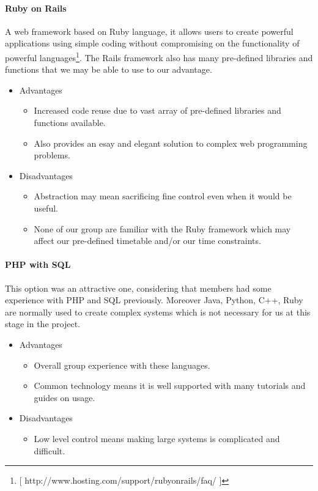\paragraph{Ruby on Rails}
A web framework based on Ruby language, it allows users to create powerful applications using simple coding without compromising on the functionality of powerful languages\footnote{[ http://www.hosting.com/support/rubyonrails/faq/ ]}. The Rails framework also has many pre-defined libraries and functions that we may be able to use to our advantage.
\begin{itemize}
\item Advantages
	\begin{itemize}
	\item Increased code reuse due to vast array of pre-defined libraries and functions available.
	\item Also provides an esay and elegant solution to complex web programming problems.
	\end {itemize}
\item Disadvantages
	\begin{itemize}
	\item Abstraction may mean sacrificing fine control even when it would be useful.
	\item None of our group are familiar with the Ruby framework which may affect our pre-defined timetable and/or our time constraints.
	\end {itemize}
\end {itemize}

\paragraph{PHP with SQL}
This option was an attractive one, considering that members had some experience with PHP and SQL previously. Moreover Java, Python, C++, Ruby are normally used to create complex systems which is not necessary for us 
at this stage in the project.
\begin{itemize}
\item Advantages
	\begin{itemize}
	\item Overall group experience with these languages. 
	\item Common technology means it is well supported with many tutorials and guides on usage.
	\end {itemize}
\item Disadvantages
	\begin{itemize}
	\item Low level control means making large systems is complicated and difficult.
	\end {itemize}
\end {itemize}

